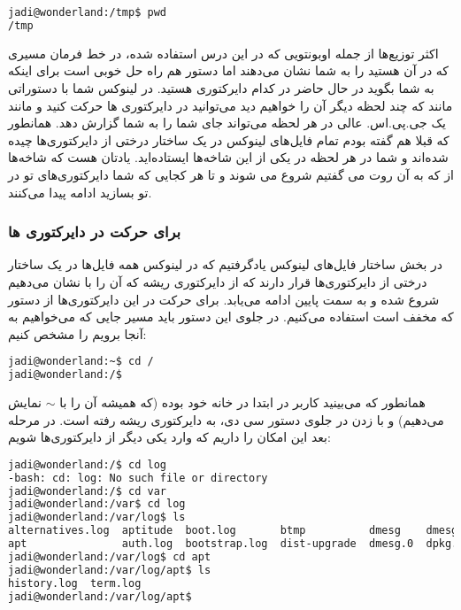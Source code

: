 \begin{latin}
\begin{lstlisting}[language=bash,basicstyle=\ttfamily,linewidth=12cm]
jadi@wonderland:/tmp$ pwd
/tmp
\end{lstlisting}
\end{latin}

اکثر توزیع‌ها از جمله اوبونتویی که در این درس استفاده شده، در خط فرمان مسیری که در آن هستید را به شما نشان می‌دهند اما دستور 
 هم راه حل خوبی است برای اینکه به شما بگوید در حال حاضر در کدام دایرکتوری هستید. در لینوکس شما با دستوراتی مانند  که چند لحظه دیگر آن را خواهیم دید می‌توانید در دایرکتوری ها حرکت کنید و 
 مانند یک جی.پی.اس. عالی در هر لحظه می‌تواند جای شما را به شما گزارش دهد. همانطور که قبلا هم گفته بودم تمام فایل‌های لینوکس در یک ساختار درختی از دایرکتوری‌ها چیده شده‌اند و شما در هر لحظه در یکی از این شاخه‌ها ایستاده‌اید. یادتان هست که شاخه‌ها از \lr{/} که به آن روت می گفتیم شروع می شوند و تا هر کجایی که شما دایرکتوری‌های تو در تو بسازید ادامه پیدا می‌کنند.
\subsubsection*{ برای حرکت در دایرکتوری ها}
در بخش ساختار فایل‌های لینوکس  یادگرفتیم که در لینوکس همه فایل‌ها در یک ساختار درختی از دایرکتوری‌ها قرار دارند که از دایرکتوری ریشه که آن را با \lr{/} نشان می‌دهیم شروع شده و به سمت پایین ادامه می‌یابد. برای حرکت در این دایرکتوری‌ها از دستور  که مخفف  است استفاده می‌کنیم. در جلوی این دستور باید مسیر جایی که می‌خواهیم به آنجا برویم را مشخص کنیم:

\begin{latin}
\begin{lstlisting}[language=bash,basicstyle=\ttfamily,linewidth=12cm]
jadi@wonderland:~$ cd /
jadi@wonderland:/$ 
\end{lstlisting}
\end{latin}

همانطور که می‌بینید کاربر در ابتدا در خانه خود بوده (که همیشه آن را با $\sim$ نمایش می‌دهیم) و با زدن \lr{/} در جلوی دستور سی دی، به دایرکتوری ریشه رفته است. در مرحله بعد این امکان را داریم که وارد یکی دیگر از دایرکتوری‌ها شویم:

\begin{latin}
\begin{lstlisting}[language=bash,basicstyle=\ttfamily,linewidth=12cm]
jadi@wonderland:/$ cd log
-bash: cd: log: No such file or directory
jadi@wonderland:/$ cd var
jadi@wonderland:/var$ cd log
jadi@wonderland:/var/log$ ls
alternatives.log  aptitude  boot.log       btmp          dmesg    dmesg.1.gz  faillog  installer  landscape  syslog  unattended-upgrades  wtmp
apt               auth.log  bootstrap.log  dist-upgrade  dmesg.0  dpkg.log    fsck     kern.log   lastlog    udev    upstart
jadi@wonderland:/var/log$ cd apt
jadi@wonderland:/var/log/apt$ ls
history.log  term.log
jadi@wonderland:/var/log/apt$ 
\end{lstlisting}
\end{latin}

